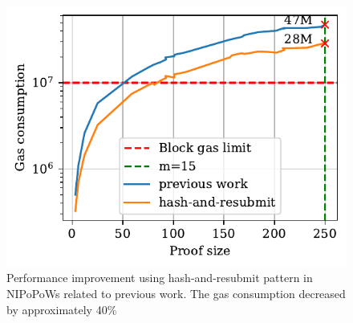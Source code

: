 

\begin{figure}[h]
    \begin{center}
        \includegraphics[width=1\columnwidth]{figures/har-nipopows.pdf}
    \end{center}
    \caption{Performance improvement using hash-and-resubmit pattern in
    NIPoPoWs related to previous work. The gas consumption decreased by
    approximately 40\%}
    \label{fig:har-nipopow}
\end{figure}
